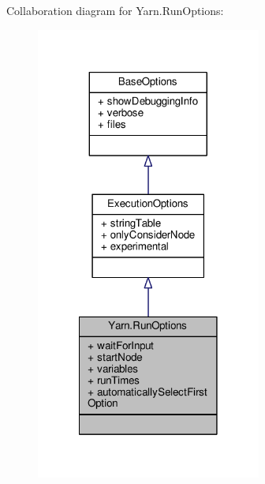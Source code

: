 Collaboration diagram for Yarn.\-Run\-Options\-:
\nopagebreak
\begin{figure}[H]
\begin{center}
\leavevmode
\includegraphics[width=210pt]{a00742}
\end{center}
\end{figure}
